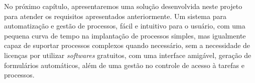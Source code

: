 No próximo capítulo, apresentaremos uma solução desenvolvida neste projeto para atender os requisitos apresentados anteriormente. Um sistema para automatização e gestão de processos, fácil e intuitivo para o usuário, com uma pequena curva de tempo na implantação de processos simples, mas igualmente capaz de suportar processos complexos quando necessário, sem a necessidade de licenças por utilizar \textit{softwares} gratuitos, com uma interface amigável, geração de formulários automáticos, além de uma gestão no controle de acesso à tarefas e processos.